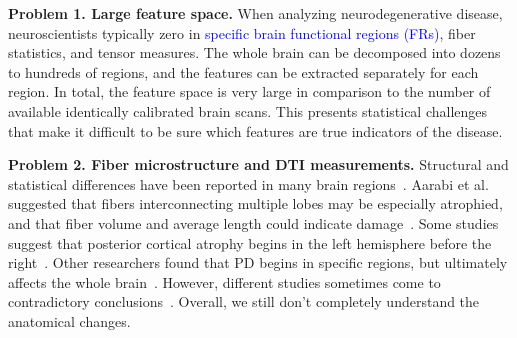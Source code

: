 \noindent\textbf{Problem 1. Large feature space.}
When analyzing neurodegenerative disease, neuroscientists typically zero in \textcolor{blue}{specific brain functional regions (FRs)}, fiber statistics, and tensor measures. 
The whole brain
can be decomposed into dozens to hundreds of 
regions, 
and the features can be extracted 
separately
for each region. In total, the feature space is very large in  
comparison to the number of available identically calibrated brain scans.
This presents statistical challenges that make it difficult to be sure which features are true indicators of the disease.

\vspace{1pt}
\noindent\textbf{Problem 2. Fiber microstructure and DTI measurements.}
Structural and statistical differences 
have been reported in many brain regions~\cite{zhang2015diffusion, aarabi2015statistical,wei2016combined}. Aarabi et al. suggested that fibers interconnecting multiple lobes may be 
especially atrophied, and that fiber volume and average 
length could %
indicate damage~\cite{aarabi2015statistical}. Some studies
suggest that posterior cortical atrophy begins in the left hemisphere before the right~\cite{claassen2016cortical}. 
Other researchers found that PD %
begins in specific regions, but ultimately affects the whole brain~\cite{olde2013disrupted,yau2018network}.
However, different studies sometimes come to contradictory conclusions~\cite{zhang2015diffusion, wen2016white}. Overall, we still don't completely understand the anatomical changes.

